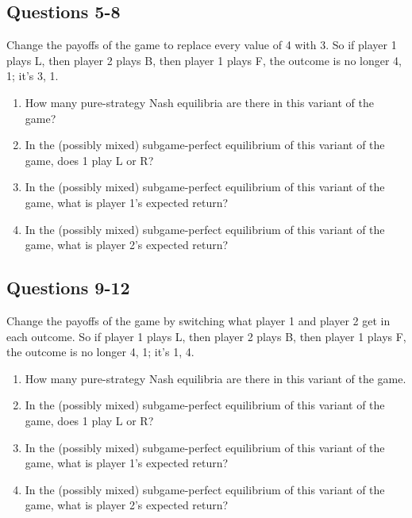 \documentclass[
  11pt,
]{article}
\providecommand{\tightlist}{%
  \setlength{\itemsep}{0pt}\setlength{\parskip}{0pt}}
\begin{document}
\hypertarget{questions-5-8}{%
\subsection{Questions 5-8}\label{questions-5-8}}

Change the payoffs of the game to replace every value of 4 with 3. So if
player 1 plays L, then player 2 plays B, then player 1 plays F, the
outcome is no longer 4, 1; it's 3, 1.

\begin{enumerate}
\def\labelenumi{\arabic{enumi}.}
\setcounter{enumi}{4}
\tightlist
\item
  How many pure-strategy Nash equilibria are there in this variant of
  the game?
\item
  In the (possibly mixed) subgame-perfect equilibrium of this variant of
  the game, does 1 play L or R?
\item
  In the (possibly mixed) subgame-perfect equilibrium of this variant of
  the game, what is player 1's expected return?
\item
  In the (possibly mixed) subgame-perfect equilibrium of this variant of
  the game, what is player 2's expected return?
\end{enumerate}

\hypertarget{questions-9-12}{%
\subsection{Questions 9-12}\label{questions-9-12}}

Change the payoffs of the game by switching what player 1 and player 2
get in each outcome. So if player 1 plays L, then player 2 plays B, then
player 1 plays F, the outcome is no longer 4, 1; it's 1, 4.

\begin{enumerate}
\def\labelenumi{\arabic{enumi}.}
\setcounter{enumi}{8}
\tightlist
\item
  How many pure-strategy Nash equilibria are there in this variant of
  the game.
\item
  In the (possibly mixed) subgame-perfect equilibrium of this variant of
  the game, does 1 play L or R?
\item
  In the (possibly mixed) subgame-perfect equilibrium of this variant of
  the game, what is player 1's expected return?
\item
  In the (possibly mixed) subgame-perfect equilibrium of this variant of
  the game, what is player 2's expected return?
\end{enumerate}
\end{document}
